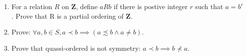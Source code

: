 \documentclass{article}
\begin{document}
\begin{enumerate}
  \item For a relation $R$ on $\mathbf{Z}$,
  define $aRb$ if there is postive integer $r$ such that $a = b^r$.
  Prove that R is a partial ordering of $\mathbf{Z}$.

  \item Prove:
  $
  \forall a, b \in S, a\prec b \implies (a\precsim b \land a \neq b)
  $.

  \item Prove that quassi-ordered is not symmetry: $a\prec b \implies b \not\prec a$.

\end{enumerate}
\end{document}
